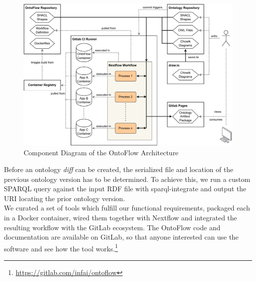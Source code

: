\documentclass[runningheads]{llncs}
\begin{document}
\begin{figure}[htbp]
	\centering
  \includegraphics[width=1\textwidth]{architecture_landscape.pdf}
	\caption{Component Diagram of the OntoFlow Architecture}
	\label{fig:architecture}
\end{figure}
Before an ontology \textit{diff} can be created, the serialized file and location of the previous ontology version has to be determined. To achieve this, we run a custom SPARQL query against the input RDF file with sparql-integrate and output the URI locating the prior ontology version.\\
We curated a set of tools which fulfill our functional requirements, packaged each in a Docker container, wired them together with Nextflow and integrated the resulting workflow with the GitLab ecosystem.
The OntoFlow code and documentation are available on GitLab, so that anyone interested can use the software and see how the tool works.\footnote{\url{https://gitlab.com/infai/ontoflow}}
\end{document}

